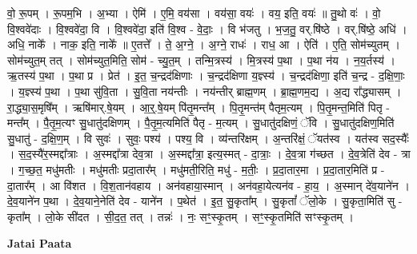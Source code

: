 \documentclass[17pt]{extarticle}
\begin{document}
वो॒ रू॒पम् । रू॒पम॒भि । अ॒भ्या । ऐमि॑ । ए॒मि॒ वय॑सा । वय॑सा॒ वयः॑ । वय॒ इति॒ वयः॑ ॥ तु॒थो वः॑ । वो॒ वि॒श्ववे॑दाः । वि॒श्ववे॑दा॒ वि । वि॒श्ववे॑दा॒ इति॑ वि॒श्व - वे॒दाः॒ । वि भ॑जतु । भ॒ज॒तु॒ वर्.षि॑ष्ठे । वर्.षि॑ष्ठे॒ अधि॑ । अधि॒ नाके᳚ । नाक॒ इति॒ नाके᳚ ॥ ए॒तत्ते᳚ । ते॒ अ॒ग्ने॒ । अ॒ग्ने॒ राधः॑ । राध॒ आ । ऐति॑ । ए॒ति॒ सोम॑च्युतम् । सोम॑च्युत॒म् तत् । सोम॑च्युत॒मिति॒ सोम॑ - च्यु॒त॒म् । तन्मि॒त्रस्य॑ । मि॒त्रस्य॑ प॒था । प॒था न॑य । न॒य॒र्तस्य॑ । ऋ॒तस्य॑ प॒था । प॒था प्र । प्रेत॑ । इ॒त॒ च॒न्द्रद॑क्षिणाः । च॒न्द्रद॑क्षिणा य॒ज्ञ्स्य॑ । च॒न्द्रद॑क्षिणा॒ इति॑ च॒न्द्र - द॒क्षि॒णाः॒ । य॒ज्ञ्स्य॑ प॒था । प॒था सु॑वि॒ता । सु॒वि॒ता नय॑न्तीः । नय॑न्तीर् ब्राह्म॒णम् । ब्रा॒ह्म॒णम॒द्य । अ॒द्य रा᳚द्ध्यासम् । रा॒द्ध्या॒स॒मृषि᳚म् । ऋषि॑मार्.षे॒यम् । आ॒र्॒.षे॒यम् पि॑तृ॒मन्त᳚म् । पि॒तृ॒मन्त॑म् पैतृम॒त्यम् । पि॒तृ॒मन्त॒मिति॑ पितृ - मन्त᳚म् । पै॒तृ॒म॒त्यꣳ सु॒धातु॑दक्षिणम् । पै॒तृ॒म॒त्यमिति॑ पैतृ - म॒त्यम् । सु॒धातु॑दक्षिणं॒ ॅवि । सु॒धातु॑दक्षिण॒मिति॑ सु॒धातु॑ - द॒क्षि॒ण॒म् । वि सुवः॑ । सुवः॒ पश्य॑ । पश्य॒ वि । व्य॑न्तरि॑क्षम् । अ॒न्तरि॑क्षं॒ ॅयत॑स्व । यत॑स्व सद॒स्यैः᳚ । स॒द॒स्यै॑र॒स्मद्दा᳚त्राः । अ॒स्मद्दा᳚त्रा देव॒त्रा । अ॒स्मद्दा᳚त्रा॒ इत्य॒स्मत् - दा॒त्राः॒ । दे॒व॒त्रा ग॑च्छत । दे॒व॒त्रेति॑ देव - त्रा । ग॒च्छ॒त॒ मधु॑मतीः । मधु॑मतीः प्रदा॒तार᳚म् । मधु॑मती॒रिति॒ मधु॑ - म॒तीः॒ । प्र॒दा॒तार॒मा । प्र॒दा॒तार॒मिति॑ प्र - दा॒तार᳚म् । आ वि॑शत । वि॒श॒तान॑वहाय । अन॑वहाया॒स्मान् । अन॑वहा॒येत्यन॑व - हा॒य॒ । अ॒स्मान् दे॑व॒याने॑न । दे॒व॒याने॑न प॒था । दे॒व॒याने॒नेति॑ देव - याने॑न । प॒थेत॑ । इ॒त॒ सु॒कृता᳚म् । सु॒कृतां᳚ ॅलो॒के । सु॒कृता॒मिति॑ सु - कृता᳚म् । लो॒के सी॑दत । सी॒द॒त॒ तत् । तन्नः॑ । नः॒ सꣳ॒॒स्कृ॒तम् । सꣳ॒॒स्कृ॒तमिति॑ सꣳस्कृ॒तम् । \newline

\textbf{Jatai Paata} \newline
\end{document}
